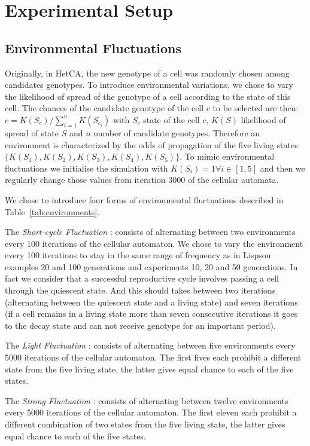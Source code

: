 \documentclass[letterpaper]{article}
\begin{document}
\section{Experimental Setup}
\subsection{Environmental Fluctuations}
Originally, in HetCA, the new genotype of a cell was randomly chosen among candidates genotypes. To introduce environmental variations, we chose to vary the likelihood of spread of the genotype of a cell according to the state of this cell. The chances of the candidate genotype of the cell $c$ to be selected are then: $c=K(S_c)/\sum_{i=1}^{n} K(S_{c_i})$ with $S_c$ state of the cell $c$, $K(S)$ likelihood of spread of state $S$ and $n$ number of candidate genotypes. Therefore an environment is characterized by the odds of propagation of the five living states $\{K(S_1),K(S_2),K(S_3),K(S_4),K(S_5)\}$.   
To mimic environmental fluctuations we initialise the simulation with $K(S_i)=1  \forall i \in [1,5]$ and then we regularly change those values from iteration 3000 of the cellular automata. 

We chose to introduce four forms of environmental fluctuations described in Table~\ref{tab:environments}.

\noindent The \emph{Short-cycle Fluctuation} : consists of alternating between two environments every 100 iterations of the cellular automaton. We chose to vary the environment every 100 iterations to stay in the same range of frequency as in Lispson \cite{lipson2002origin} examples 20 and 100 generations and \cite{yu2007program} experiments 10, 20 and 50 generations. In fact we consider that a successful reproductive cycle involves passing a cell through the quiescent state. And this should takes between two iterations (alternating between the quiescent state and a living state) and seven iterations  (if a cell remains in a living state more than seven consecutive iterations it goes to the decay state and can not receive genotype for an important period).

\noindent The \emph{Light Fluctuation} : consists of alternating between five environments every 5000 iterations of the cellular automaton. The first fives each prohibit a different state from the five living state, the latter gives equal chance to each of the five states.

\noindent The \emph{Strong Fluctuation} : consists of alternating between twelve environments every 5000 iterations of the cellular automaton. The first eleven each prohibit a different combination of two states from the five living state, the latter gives equal chance to each of the five states.
\end{document}
